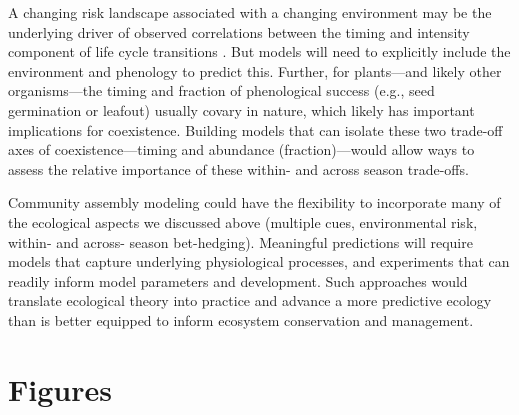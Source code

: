 \documentclass{article}[12pt]
\begin{document}
A changing risk landscape associated with a changing environment may be the underlying driver of observed correlations between the timing and intensity component of life cycle transitions \citep[i.e., germination phenology and total germination percent of a seed cohort, ][]{Baskin2014}. But models will need to explicitly include the environment and phenology to predict this. Further, for plants---and likely other organisms---the timing and fraction of phenological success (e.g., seed germination or leafout) usually covary in nature, which likely has important implications for coexistence. Building models that can isolate these two trade-off axes of coexistence---timing and abundance (fraction)---would allow ways to assess the relative importance of these within- and across season trade-offs.

Community assembly modeling could have the flexibility to incorporate many of the ecological aspects we discussed above (multiple cues, environmental risk, within- and across- season bet-hedging). Meaningful predictions will require models that capture underlying physiological processes, and experiments that can readily  inform model parameters and development. Such approaches would translate ecological theory into practice and advance a more predictive ecology than is better equipped to inform ecosystem conservation and management. %


\section*{Figures}
\end{document}
